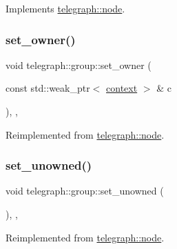 Implements \hyperlink{classtelegraph_1_1node_a5006b21e9b83ecd52f3f953a1b828773}{telegraph\+::node}.

\mbox{\label{classtelegraph_1_1group_ae4887f80cadba073aef9feef1295fb20}} 
\subsubsection{\texorpdfstring{set\+\_\+owner()}{set\_owner()}}
{\footnotesize\ttfamily void telegraph\+::group\+::set\+\_\+owner (\begin{DoxyParamCaption}\item[{const std\+::weak\+\_\+ptr$<$ \hyperlink{classtelegraph_1_1context}{context} $>$ \&}]{c }\end{DoxyParamCaption})\hspace{0.3cm}{\ttfamily [inline]}, {\ttfamily [override]}, {\ttfamily [virtual]}}



Reimplemented from \hyperlink{classtelegraph_1_1node_a6d864584bfadd3520194066f8b62812b}{telegraph\+::node}.

\mbox{\label{classtelegraph_1_1group_af56fb03ad97aadd9be32c5e47c6d195b}} 
\subsubsection{\texorpdfstring{set\+\_\+unowned()}{set\_unowned()}}
{\footnotesize\ttfamily void telegraph\+::group\+::set\+\_\+unowned (\begin{DoxyParamCaption}{ }\end{DoxyParamCaption})\hspace{0.3cm}{\ttfamily [inline]}, {\ttfamily [override]}, {\ttfamily [virtual]}}



Reimplemented from \hyperlink{classtelegraph_1_1node_ac0bbcb9d810a2cca87b120301c0972a0}{telegraph\+::node}.

\mbox{\label{classtelegraph_1_1group_a92934fab7dc94207f4d98a40deef0f55}} 
